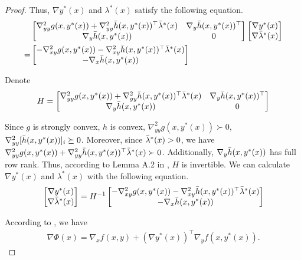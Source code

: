 \documentclass{article}
\theoremstyle{plain}
\theoremstyle{definition}
\theoremstyle{remark}
\begin{document}
\begin{proof}
Thus, $\nabla y^*(x)$ and $\lambda^*(x)$ satisfy the following equation. 
\begin{align}
&\begin{bmatrix}
\nabla^2_{yy} g(x, y^*(x))+\nabla^2_{yy}\Bar{h}(x,y^*(x))^\top\Bar{\lambda}^*(x) & \nabla_y\Bar{h}(x,y^*(x))^\top \\
\nabla_y\Bar{h}(x,y^*(x)) & 0
\end{bmatrix}
\begin{bmatrix}
\nabla y^*(x) \\
\nabla \Bar{\lambda}^*(x)
\end{bmatrix}
\\
=&
\begin{bmatrix}
-\nabla^2_{xy} g(x, y^*(x))-\nabla^2_{xy}\Bar{h}(x,y^*(x))^\top\Bar{\lambda}^*(x)\\
-\nabla_x\Bar{h}(x,y^*(x))
\end{bmatrix}
\end{align}

Denote
\begin{align}\label{eq: H}
    H=\begin{bmatrix}
\nabla^2_{yy} g(x, y^*(x))+\nabla^2_{yy}\Bar{h}(x,y^*(x))^\top\Bar{\lambda}^*(x) & \nabla_y\Bar{h}(x,y^*(x))^\top \\
\nabla_y\Bar{h}(x,y^*(x)) & 0
\end{bmatrix}
\end{align}

Since $g$ is strongly convex, $h$ is convex, $\nabla^2_{yy} g(x, y^*(x))\succ 0$, $\nabla^2_{yy}[\Bar{h}(x,y^*(x))]_i\succeq 0$. Moreover, since $\Bar{\lambda}^*(x)> 0$, we have $\nabla^2_{yy} g(x, y^*(x))+\nabla^2_{yy}\Bar{h}(x,y^*(x))^\top\Bar{\lambda}^*(x)\succ 0$. Additionally, $\nabla_y\Bar{h}(x,y^*(x))$ has full row rank. Thus, according to  Lemma A.2 in \cite{kornowski2024first}, $H$ is invertible. We can calculate $\nabla y^*(x)$ and $\lambda^*(x)$ with the following equation.
\begin{align}
\begin{bmatrix}
\nabla y^*(x) \\
\nabla \Bar{\lambda}^*(x)
\end{bmatrix}
=
H^{-1}
\begin{bmatrix}
-\nabla^2_{xy} g(x, y^*(x))-\nabla^2_{xy}\Bar{h}(x,y^*(x))^\top\Bar{\lambda}^*(x)\\
-\nabla_x\Bar{h}(x,y^*(x))
\end{bmatrix}\label{eq: nabla y}
\end{align}

According to \cite{ghadimi2018approximation}, we have
\begin{align*}
    \nabla \Phi(x)=\nabla_x f(x,y)+(\nabla y^*(x))^\top \nabla_y f(x,y^*(x)).
\end{align*}

\end{proof}
\end{document}
